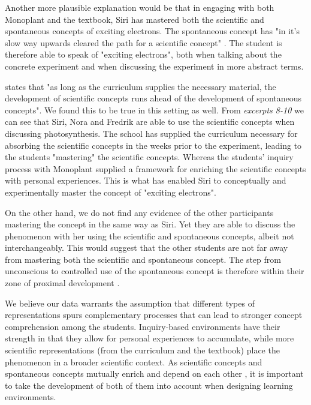 Another more plausible explanation would be that in engaging with both Monoplant and the textbook, Siri has mastered both the scientific and spontaneous concepts of exciting electrons. The spontaneous concept has "in it's slow way upwards cleared the path for a scientific concept" \citep{vygotsky2012thought}. The student is therefore able to speak of "exciting electrons", both when talking about the concrete experiment and when discussing the experiment in more abstract terms. 

\citet{vygotsky2012thought} states that "as long as the curriculum supplies the necessary material, the development of scientific concepts runs ahead of the development of spontaneous concepts". We found this to be true in this setting as well. From \emph{excerpts 8-10} we can see that Siri, Nora and Fredrik are able to use the scientific concepts when discussing photosynthesis. The school has supplied the curriculum necessary for absorbing the scientific concepts in the weeks prior to the experiment, leading to the students "mastering" the scientific concepts. Whereas the students' inquiry process with Monoplant supplied a framework for enriching the scientific concepts with personal experiences. This is what has enabled Siri to conceptually and experimentally master the concept of "exciting electrons".  

On the other hand, we do not find any evidence of the other participants mastering the concept in the same way as Siri. Yet they are able to discuss the phenomenon with her using the scientific and spontaneous concepts, albeit not interchangeably. This would suggest that the other students are not far away from mastering both the scientific and spontaneous concept. The step from unconscious to controlled use of the spontaneous concept is therefore within their zone of proximal development \citep{vygotsky2012thought}. 

We believe our data warrants the assumption that different types of representations spurs complementary processes that can lead to stronger concept comprehension among the students. Inquiry-based environments have their strength in that they allow for personal experiences to accumulate, while more scientific representations (from the curriculum and the textbook) place the phenomenon in a broader scientific context. As scientific concepts and spontaneous concepts mutually enrich and depend on each other \citep{vygotsky2012thought}, it is important to take the development of both of them into account when designing learning environments. 

